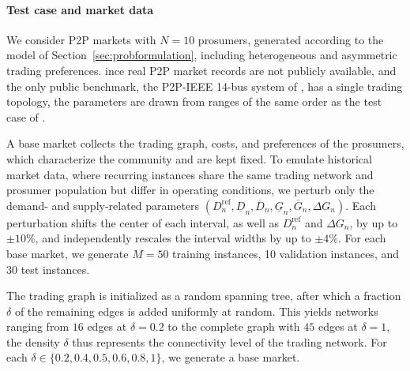 \documentclass[final]{l4dc2026}
\begin{document}
\paragraph{Test case and market data}
We consider P2P markets with $N = 10$ prosumers, generated according to
the model of Section~\ref{sec:probformulation}, including
heterogeneous and asymmetric trading preferences.
ince real P2P market records are not
publicly available, and the only public benchmark, the P2P-IEEE 14-bus
system of \citet{sousa2019peer}, has a single trading topology, the
parameters are drawn from ranges of the same order as the test case of
\citet{cadre_peer-peer_2020}.

A base market collects the trading graph, costs, and preferences of the prosumers, which characterize the community and are kept fixed. To emulate historical market data, where recurring instances share the same trading network
and prosumer population but differ in operating conditions, we perturb
only the demand- and supply-related parameters $(D^{\mathrm{ref}}_n, \underline{D}_n, \overline{D}_n, \underline{G}_n, \overline{G}_n, \Delta G_n)$. Each perturbation shifts the center of each interval, as well as $D_n^{\mathrm{ref}}$ and $\Delta G_n$, by up to $\pm10\%$, and independently rescales the interval widths by up to $\pm4\%$. For each base market, we generate $M = 50$
training instances, 10 validation instances, and $30$ test
instances.

The trading graph is initialized as a random spanning
tree, after which a fraction $\delta$ of the remaining edges is added
uniformly at random. This yields networks ranging from $16$ edges at
$\delta = 0.2$ to the complete graph with $45$ edges at $\delta = 1$,
the density $\delta$ thus represents the connectivity level of the
trading network. For each
$\delta \in \{0.2, 0.4, 0.5, 0.6, 0.8, 1\}$, we generate a base
market.
\end{document}
